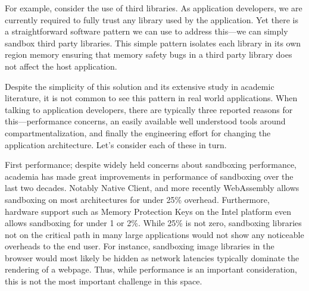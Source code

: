 For example, consider the use of third libraries.
%
As application developers, we are currently required to fully trust any library 
used by the application.
%
Yet there is a straightforward software pattern we can use to address this---we 
can simply sandbox third party libraries.
%
This simple pattern isolates each library in its own region memory ensuring 
that memory safety bugs in a third party library does not affect the host 
application.
%

Despite the simplicity of this solution and its extensive study in academic 
literature, it is not common to see this pattern in real world applications.
%
When talking to application developers, there are typically three reported 
reasons for this---performance concerns, an easily available well understood 
tools around compartmentalization, and finally the engineering effort for 
changing the application architecture.
%
Let's consider each of these in turn.

First performance; despite widely held concerns about sandboxing performance, 
academia has made great improvements in performance of sandboxing over 
the last two decades.
%
Notably Native Client, and more recently WebAssembly allows sandboxing on most 
architectures for under 25\% overhead.
%
Furthermore, hardware support such as Memory Protection Keys on the Intel 
platform even allows sandboxing for under 1 or 2\%.
%
While 25\% is not zero, sandboxing libraries not on the critical path in many 
large applications would not show any noticeable overheads to the end user.
%
For instance, sandboxing image libraries in the browser would most likely be 
hidden as network latencies typically dominate the rendering of a webpage.
%
Thus, while performance is an important consideration, this is not the most 
important challenge in this space.

